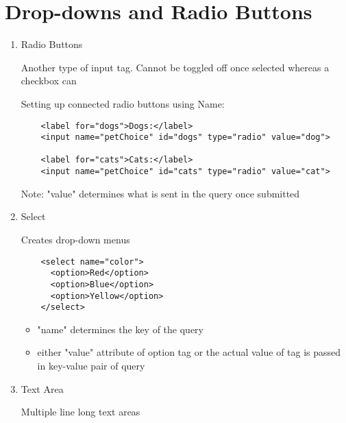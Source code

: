 \documentclass{article}
\begin{document}
\section{Drop-downs and Radio Buttons}
\begin{enumerate}
	\item Radio Buttons
	
	Another type of input tag. Cannot be toggled off once selected whereas a checkbox can
	\begin{center}
		Setting up connected radio buttons using Name:
	\end{center}
	\begin{verbatim}
	<label for="dogs">Dogs:</label>
	<input name="petChoice" id="dogs" type="radio" value="dog">
	
	<label for="cats">Cats:</label>
	<input name="petChoice" id="cats" type="radio" value="cat">
	\end{verbatim}
	Note: "value" determines what is sent in the query once submitted
	\item Select
	
	Creates drop-down menus
	\begin{verbatim}
	<select name="color">
	  <option>Red</option>
	  <option>Blue</option>
	  <option>Yellow</option>
	</select>
	\end{verbatim}
	\begin{itemize}
		\item "name" determines the key of the query
		\item either "value" attribute of option tag or the actual value of tag is passed in key-value pair of query
	\end{itemize}

	\item Text Area
	
	Multiple line long text areas
\end{enumerate}
\end{document}
